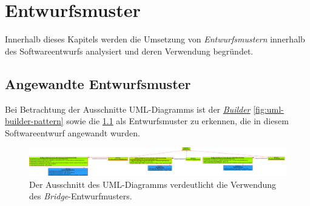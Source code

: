 \chapter{Entwurfsmuster}
\label{entwurfsmuster}
Innerhalb dieses Kapitels werden die Umsetzung von \textit{Entwurfsmustern} innerhalb des Softwareentwurfs analysiert und deren Verwendung begründet.


\section{Angewandte Entwurfsmuster}
Bei Betrachtung der Ausschnitte UML-Diagramms ist der \href{https://github.com/lucasmerkel/dhbw-advancedswe-programmentwurf/blob/2bab7b1c200507e4550ce7025485261d0e95ce07/Documentation/Bilder/uml-diagramme/uml-entwurfsmuster-builder.svg}{\textit{Builder}} \ref{fig:uml-builder-pattern} sowie die \href{https://github.com/lucasmerkel/dhbw-advancedswe-programmentwurf/blob/d5c89113d12c3b877ddc4d6a99225b277ddd468f/Documentation/Bilder/uml-diagramme/uml-entwurfsmuster-bridge.svg}{} \ref{fig:uml-bridge-pattern} als Entwurfsmuster zu erkennen, die in diesem Softwareentwurf angewandt wurden.

\begin{figure}[H]
 	\centering
 	\includegraphics[width=1.0\textwidth]{Bilder/uml-diagramme/entwurfsmuster-bridge.png}
 	\caption[Ausschnitt des UML-Diagramms zur Darstellung des \textit{Bridge}-Entwurfmusters.]{Der Ausschnitt des UML-Diagramms verdeutlicht die Verwendung des \textit{Bridge}-Entwurfmusters.}
 	\label{fig:uml-bridge-pattern}
 \end{figure}

